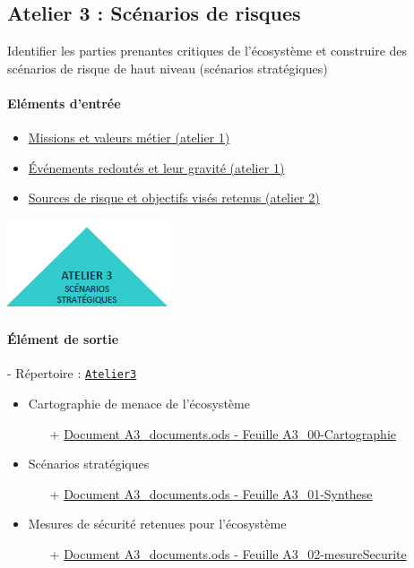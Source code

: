 \documentclass[french, 12pt]{article}%
\newcommand{\itemE}{\item[$\bullet$]}
\newcommand{\titreencadre}{Titre}
\newenvironment{encadre}[1]{\renewcommand{\titreencadre}{#1}
	\begin{mdframed}[style=encadrestyle]
	\vspace{0.5\baselineskip}
	}{%
	\end{mdframed}}
\begin{document}
\subsection{Atelier 3 : Scénarios de risques}
\begin{encadre}{Objectif}
Identifier les parties prenantes critiques de l’écosystème et construire des scénarios de
risque de haut niveau (scénarios stratégiques)
\end{encadre}


\begin{minipage}[c]{0.6\linewidth}
\paragraph{Eléments d'entrée}
\begin{itemize}
\itemE \href{run:./ressource_eleve/Atelier1/A1_documents.ods}{Missions et valeurs métier (atelier 1)}
\itemE \href{run:./ressource_eleve/Atelier1/A1_documents.ods}{Événements redoutés et leur gravité (atelier 1)}
\itemE \href{run:./ressource_eleve/Atelier2/A2_documents.ods}{Sources de risque et objectifs visés retenus (atelier 2)}
\end{itemize}

\end{minipage}
\begin{minipage}[c]{0.4\linewidth}
\begin{center}
\includegraphics[scale=0.8]{./ressource/logoA3.png}
\end{center}
\end{minipage}



\paragraph{Élément de sortie} - Répertoire : \href{run:./ressource_eleve/Atelier3/}{\verb?Atelier3?}
\begin{itemize}
    \itemE Cartographie de menace de l’écosystème
    	\begin{itemize}
		\item[+] \href{run:./ressource_eleve/Atelier3/A3_documents.ods}{Document A3\_documents.ods - Feuille A3\_00-Cartographie}	
		\end{itemize}
	\itemE Scénarios stratégiques
		\begin{itemize}
		\item[+] \href{run:./ressource_eleve/Atelier3/A3_documents.ods}{Document A3\_documents.ods - Feuille A3\_01-Synthese}
		\end{itemize}
 	\itemE Mesures de sécurité retenues pour l’écosystème
 		\begin{itemize}
		\item[+] \href{run:./ressource_eleve/Atelier3/A3_documents.ods}{Document A3\_documents.ods - Feuille A3\_02-mesureSecurite}
		\end{itemize}
\end{itemize}
\end{document}

